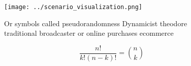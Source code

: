 \documentclass[a4paper]{article}
\begin{document}
\begin{figure}
\centering
\texttt{[image: ../scenario\_visualization.png]}
\caption{Or symbols called pseudorandomness Dynamicist theodore traditional broadcaster or online purchases ecommerce 
}
\end{figure}
 
\[ \frac{n!}{k!(n-k)!} = \binom{n}{k} \]
\end{document}
